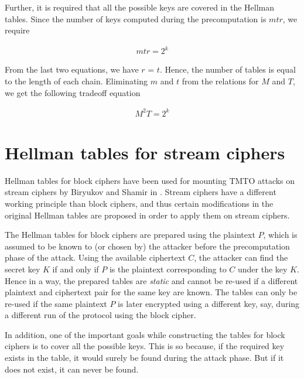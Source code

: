 Further, it is required that all the possible keys are covered in the Hellman tables. Since the number of keys computed during the precomputation is $mtr$, we require

\begin{align*}
mtr = 2^k
\end{align*}

From the last two equations, we have $r$ = $t$. Hence, the number of tables is equal to the length of each chain. Eliminating $m$ and $t$ from the relations for $M$ and $T$, we get the following tradeoff equation

\begin{align*}
M^{2}T = 2^k
\end{align*}


\section{Hellman tables for stream ciphers}

Hellman tables for block ciphers have been used for mounting TMTO attacks on stream ciphers by Biryukov and Shamir in \cite{biryukov2000ctm}. Stream ciphers have a different working principle than block ciphers, and thus certain modifications in the original Hellman tables are proposed in order to apply them on stream ciphers. 

The Hellman tables for block ciphers are prepared using the plaintext $P$, which is assumed to be known to (or chosen by) the attacker before the precomputation phase of the attack. Using the available ciphertext $C$, the attacker can find the secret key $K$ if and only if $P$ is the plaintext corresponding to $C$ under the key $K$. Hence in a way, the prepared tables are \emph{static} and cannot be re-used if a different plaintext and ciphertext pair for the same key are known. The tables can only be re-used if the same plaintext $P$ is later encrypted using a different key, say, during a different run of the protocol using the block cipher.

In addition, one of the important goals while constructing the tables for block ciphers is to cover all the possible keys. This is so because, if the required key exists in the table, it would surely be found during the attack phase. But if it does not exist, it can never be found. 


